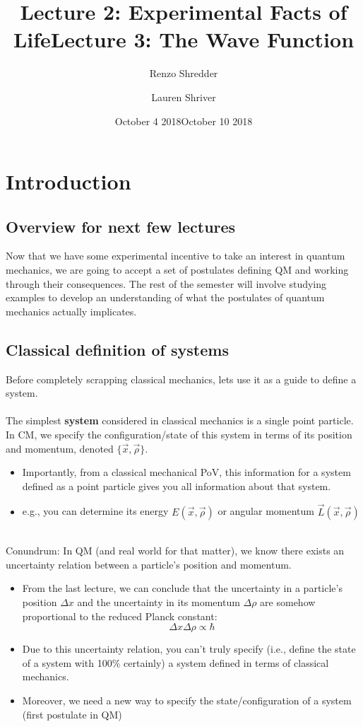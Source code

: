 \documentclass{article}
\title{Lecture 2: Experimental Facts of Life}
\author{Renzo Shredder}
\date{October 4 2018}
\title{Lecture 3: The Wave Function}
\author{Lauren Shriver}
\date{October 10 2018}
\begin{document}
\maketitle
\section*{Introduction}
\subsection*{Overview for next few lectures}
Now that we have some experimental incentive to take an interest in quantum mechanics, we are going to accept a set of postulates defining QM and working through their consequences. The rest of the semester will involve studying examples to develop an understanding of what the postulates of quantum mechanics actually implicates. 
\subsection*{Classical definition of systems}
Before completely scrapping classical mechanics, lets use it as a guide to define a system. 
\\
\\
The simplest \textbf{system} considered in classical mechanics is a single point particle. In CM, we specify the configuration/state of this system in terms of its position and momentum, denoted $\{ \vec{x}, \vec{\rho} \}$. 
\begin{itemize}
    \item Importantly, from a classical mechanical PoV, this information for a system defined as a point particle gives you all information about that system. 
    \item e.g., you can determine its energy $E(\vec{x},\vec{\rho})$ or angular momentum $\vec{L}(\vec{x},\vec{\rho})$
\end{itemize}
\\
Conundrum: In QM (and real world for that matter), we know there exists an uncertainty relation between a particle's position and momentum.
\begin{itemize}
    \item From the last lecture, we can conclude that the uncertainty in a particle's position $\Delta x$ and the uncertainty in its momentum $\Delta \rho$ are somehow proportional to the reduced Planck constant: 
        \begin{equation}
            \Delta x \Delta \rho \propto \hbar
        \end{equation}
    \item Due to this uncertainty relation, you can't truly specify (i.e., define the state of a system with 100\% certainly) a system defined in terms of classical mechanics. 
    \item Moreover, we need a new way to specify the state/configuration of a system (first postulate in QM) 
\end{itemize}
\end{document}
